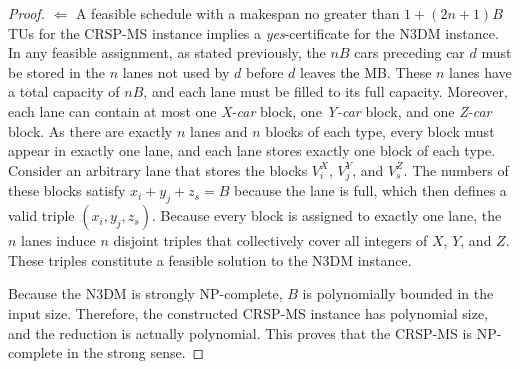 \documentclass[12pt]{article}
\begin{document}
\begin{proof}

    $\Longleftarrow$ A feasible schedule with a makespan no greater than $1+(2n+1)B$ TUs for the CRSP-MS instance implies a \textit{yes}-certificate for the N3DM instance. %
    In any feasible assignment, as stated previously, the $nB$ cars preceding car $d$ must be stored in the $n$ lanes not used by $d$ before $d$ leaves the MB. These $n$ lanes have a total capacity of $nB$, and each lane must be filled to its full capacity. Moreover, each lane can contain at most one \textit{X-car} block, one \textit{Y-car} block, and one \textit{Z-car} block. As there are exactly $n$ lanes and $n$ blocks of each type, every block must appear in exactly one lane, and each lane stores exactly one block of each type. Consider an arbitrary lane that stores the blocks $V^X_i$, $V^Y_j$, and $V^Z_s$. The numbers of these blocks satisfy $x_i + y_j + z_s = B$ because the lane is full, which then defines a valid triple $(x_i, y_j, z_s)$. Because every block is assigned to exactly one lane, the $n$ lanes induce $n$ disjoint triples that collectively cover all integers of $X$, $Y$, and $Z$. These triples constitute a feasible solution to the N3DM instance.

    Because the N3DM is strongly NP-complete, $B$ is polynomially bounded in the input size. Therefore, the constructed CRSP-MS instance has polynomial size, and the reduction is actually polynomial. This proves that the CRSP-MS is NP-complete in the strong sense.



\end{proof}
\end{document}
